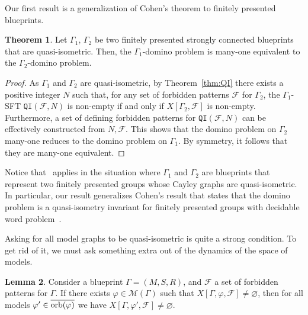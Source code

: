 \documentclass{article}
\theoremstyle{definition}
\newtheorem{theorem}{Theorem}[section] %
\newtheorem{lemma}[theorem]{Lemma}
\theoremstyle{definition}
\newcommand{\M}{\mathcal{M}}
\newcommand{\Fo}{\mathcal{F}}
\newcommand{\QI}{\mathtt{QI}}
\newcommand{\orb}{\textnormal{orb}}
\begin{document}
Our first result is a generalization of Cohen's theorem to finitely presented blueprints.
\begin{theorem}
\label{thm:domino}
        Let $\Gamma_1$, $\Gamma_2$ be two finitely presented strongly connected blueprints that are quasi-isometric. Then, the $\Gamma_1$-domino problem is many-one equivalent to the $\Gamma_2$-domino problem.
\end{theorem}

\begin{proof}
    As $\Gamma_1$ and $\Gamma_2$ are quasi-isometric, by Theorem~\ref{thm:QI} there exists a positive integer $N$ such that, for any set of forbidden patterns $\Fo$ for $\Gamma_2$, the $\Gamma_1$-SFT $\QI(\Fo, N)$ is non-empty if and only if $X[\Gamma_2, \Fo]$ is non-empty. Furthermore, a set of defining forbidden patterns for $\QI(\Fo, N)$ can be effectively constructed from $N,\Fo$. This shows that the domino problem on $\Gamma_2$ many-one reduces to the domino problem on $\Gamma_1$. By symmetry, it follows that they are many-one equivalent.
\end{proof}

Notice that~ applies in the situation where $\Gamma_1$ and $\Gamma_2$ are blueprints that represent two finitely presented groups whose Cayley graphs are quasi-isometric. In particular, our result generalizes Cohen's result that states that the domino problem is a quasi-isometry invariant for finitely presented groups with decidable word problem~\cite[Theorem 1.8]{cohen2017large}.

Asking for all model graphs to be quasi-isometric is quite a strong condition. To get rid of it, we must ask something extra out of the dynamics of the space of models.

\begin{lemma}
\label{lem:minimal}
        Consider a blueprint $\Gamma = (M,S,R)$, and $\Fo$ a set of forbidden patterns for $\Gamma$. If there exists $\varphi\in\M(\Gamma)$ such that $X[\Gamma,\varphi,\Fo]\neq\varnothing$, then for all models $\varphi'\in\overline{\orb(\varphi)}$ we have $X[\Gamma,\varphi',\Fo]\neq\varnothing$.
\end{lemma}
\end{document}
